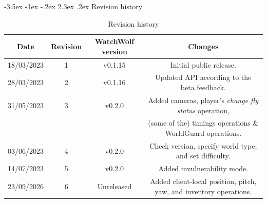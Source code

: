 \documentclass[11pt]{article}
\makeatletter
\renewcommand\section{\@startsection {section}{1}{\z@}%
                                       {-3.5ex \@plus -1ex \@minus -.2ex}%
                                       {2.3ex \@plus.2ex}%
                                       {\normalfont\fontfamily{phv}\fontsize{16}{19}\bfseries}}
\makeatother
\begin{document}
\section{Revision history}
\begin{table}[H]
	\centering
	\begin{tabular}{ |c|c|c|c| }
		\hline
		Date & Revision & WatchWolf version & Changes \\
		\hline
		18/03/2023 & 1 & v0.1.15 & Initial public release. \\
		\hline
		28/03/2023 & 2 & v0.1.16 & Updated API according to the beta feedback. \\
		\hline
		31/05/2023 & 3 & v0.2.0 & Added cameras, player's \textit{change fly status} operation, \\
						 &  &  & (some of the) timings operations \& WorldGuard operations. \\
		\hline
		03/06/2023 & 4 & v0.2.0 & Check version, specify world type, and set difficulty. \\
		\hline
		14/07/2023 & 5 & v0.2.0 & Added invulnerability mode. \\
		\hline
		23/09/2026 & 6 & Unreleased & Added client-local position, pitch, yaw, and inventory operations. \\
		\hline
	\end{tabular}
	\caption{Revision history}
\end{table}


\appendix




	
\end{document}

